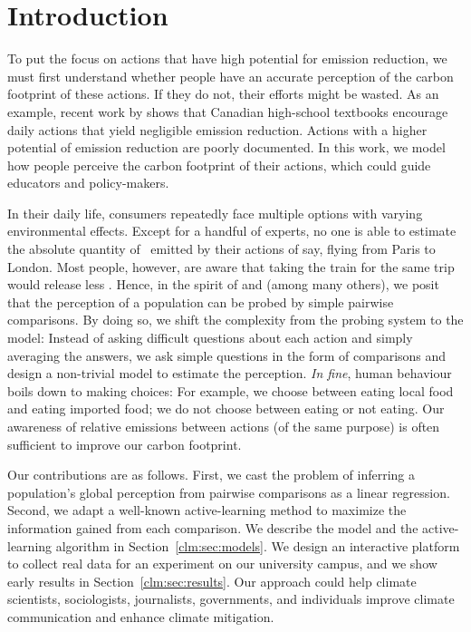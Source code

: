 \section{Introduction}
\label{clm:sec:introduction}
To put the focus on actions that have high potential for emission reduction, we must first understand whether people have an accurate perception of the carbon footprint of these actions.
If they do not, their efforts might be wasted.
As an example, recent work by \citet{wynes2017climate} shows that Canadian high-school textbooks encourage daily actions that yield negligible emission reduction.
Actions with a higher potential of emission reduction are poorly documented.
In this work, we model how people perceive the carbon footprint of their actions, which could guide educators and policy-makers.

In their daily life, consumers repeatedly face multiple options with varying environmental effects.
Except for a handful of experts, no one is able to estimate the absolute quantity of \COtwo\ emitted by their actions of say, flying from Paris to London.
Most people, however, are aware that taking the train for the same trip would release less \COtwo.
Hence, in the spirit of \citet{thurstone1927method} and \citet{salganik2015wiki} (among many others), we posit that the perception of a population can be probed by simple pairwise comparisons.
By doing so, we shift the complexity from the probing system to the model: Instead of asking difficult questions about each action and simply averaging the answers, we ask simple questions in the form of comparisons and design a non-trivial model to estimate the perception.
\textit{In fine}, human behaviour boils down to making choices: For example, we choose between eating local food and eating imported food; we do not choose between eating or not eating.
Our awareness of relative emissions between actions (of the same purpose) is often sufficient to improve our carbon footprint.

Our contributions are as follows.
First, we cast the problem of inferring a population's global perception from pairwise comparisons as a linear regression.
Second, we adapt a well-known active-learning method to maximize the information gained from each comparison.
We describe the model and the active-learning algorithm in Section~\ref{clm:sec:models}.
We design an interactive platform to collect real data for an experiment on our university campus, and we show early results in Section~\ref{clm:sec:results}.
Our approach could help climate scientists, sociologists, journalists, governments, and individuals improve climate communication and enhance climate mitigation.
